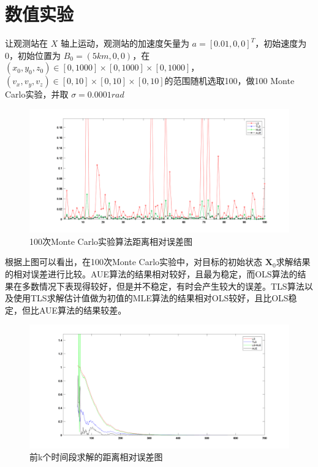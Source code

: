 \chapter{数值实验}
让观测站在 $X$ 轴上运动，观测站的加速度矢量为
 $a = [0.01,0,0]^T$，初始速度为0，初始位置为 $B_0 = (5km,0,0)$，在 $(x_0,y_0,z_0) \in [0,1000]\times[0,1000]\times[0,1000]$，$(v_x,v_y,v_z) \in [0,10]\times[0,10]\times[0,10]$的范围随机选取100，做100 Monte Carlo实验，并取 $\sigma = 0.0001rad$
\begin{figure}[htbp]
	\vspace{13pt}
	\centering
	\includegraphics[scale=0.5]{images/100MonteCarlo.png}
	\caption{100次Monte Carlo实验算法距离相对误差图}
\end{figure}

根据上图可以看出，在100次Monte Carlo实验中，对目标的初始状态 $\bm{X}_0$求解结果的相对误差进行比较。AUE算法的结果相对较好，且最为稳定，而OLS算法的结果在多数情况下表现得较好，但是并不稳定，有时会产生较大的误差。TLS算法以及使用TLS求解估计值做为初值的MLE算法的结果相对OLS较好，且比OLS稳定，但比AUE算法的结果较差。
\begin{figure}[htbp]
	\vspace{13pt}
	\centering
	\includegraphics[scale=0.5]{images/singleline.png}
	\caption{前k个时间段求解的距离相对误差图}
\end{figure}